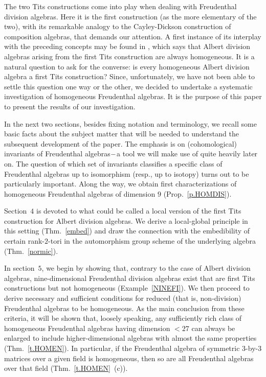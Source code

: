 \documentclass{amsart}
\theoremstyle{definition} %
\theoremstyle{remark} %
\renewcommand{\:}{\colon\,}
\numberwithin{equation}{section}
\begin{document}
The two Tits constructions come into play when dealing with Freudenthal division algebras. Here it is the first construction (as the more elementary of the two), with its remarkable analogy to the Cayley-Dickson construction of composition algebras, that demands our attention. A first instance of its interplay with the preceding concepts may be found in \cite[Cor.~4.9]{MR734841} , which says that Albert division algebras arising from the first Tits construction are always homogeneous. It is a natural question to ask for the converse: is every homogeneous Albert division algebra a first Tits construction? Since, unfortunately, we have not been able to settle this question one way or the other, we decided to undertake a systematic investigation of homogeneous Freudenthal algebras. It is the purpose of this paper to present the results of our investigation.

In the next two sections, besides fixing notation and terminology, we recall some basic facts  about the subject matter that will be needed to understand the subsequent development of the paper. The emphasis is on (cohomological) invariants of Freudenthal algebras$\--$a tool we will make use of quite heavily later on. The question of which set of invariants classifies a specific class of Freudenthal algebras up to isomorphism (resp., up to isotopy) turns out to be particularly important. Along the way, we obtain  first characterizations of homogeneous Freudenthal algebras of dimension $9$ (Prop.~\ref{p.HOMDIS}). 

Section~$4$ is devoted to what could be called a local version of the first Tits construction for Albert division algebras. We derive a local-global principle in this setting (Thm.~\ref{embed}) and draw the connection with the embedibility of certain rank-$2$-tori in the automorphism group scheme of the underlying algebra (Thm.~\ref{normic}). 

In section~$5$, we begin by showing that, contrary to the case of Albert division algebras, nine-dimensional Freudenthal division algebras exist that are first Tits constructions but not homogeneous (Example~\ref{NINEFI}). We then proceed to derive necessary and sufficient conditions for reduced (that is, non-division) Freudenthal algebras to be homogeneous. As the main conclusion from these criteria, it will be shown that, loosely speaking, any sufficiently rich class of homogeneous Freudenthal algebras having dimension $< 27$ can always be enlarged to include higher-dimensional algebras with almost the same properties (Thm.~\ref{t.HOMEN}). In particular, if the Freudenthal algebra of symmetric $3$-by-$3$ matrices over a given field is homogeneous, then so are all Freudenthal algebras over that field (Thm.~\ref{t.HOMEN}~(c)). 
\end{document}
